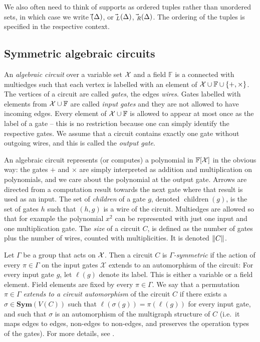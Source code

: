 \documentclass[10pt,a4paper]{article}
\theoremstyle{definition}
\theoremstyle{plain}
\theoremstyle{remark}
\DeclarePairedDelimiter{\norm}{\lVert}{\rVert}
\newcommand{\Xx}{{\cal X}}
\newcommand{\Sym}{\mathbf{Sym}}
\DeclareMathOperator{\child}{children}
\newcommand{\bbF}{\mathbb{F}}
\let\sup\relax
\DeclareMathOperator{\sup}{sup}
\begin{document}
We also often need to think of supports as ordered tuples rather than unordered sets, in which case we write $\vec{\sup}(\Delta)$, or $\vec{\sup}_L(\Delta)$, $\vec{\sup}_R(\Delta)$. The ordering of the tuples is specified in the respective context.





\subsection{Symmetric algebraic circuits}

An \emph{algebraic circuit} over a variable set $\Xx$ and a field $\bbF$ is a connected  with multiedges
such that each vertex is labelled with an element of $\Xx \cup \bbF \cup \{+,\times\}$. 	The vertices of a circuit are called \emph{gates}, the edges \emph{wires}.
Gates labelled with elements from $\Xx \cup \bbF$ are called
\emph{input gates} and they are not allowed to have incoming
edges. Every element of $\Xx \cup \bbF$ is allowed to appear at most once as the label of a gate -- this is no restriction because one can simply identify the respective gates.  We assume that a circuit contains exactly one gate without outgoing wires, and this is called the \emph{output gate}.

An algebraic circuit represents (or computes) a polynomial in
$\bbF[\Xx]$ in the obvious way: the gates $+$ and $\times$
are simply interpreted as addition and multiplication on
polynomials, and we care about the polynomial at the output
gate. Arrows are directed from a computation result towards
the next gate where that result is used as an input. The set
of \emph{children} of a gate $g$, denoted $\child(g)$, is the
set of gates $h$ such that $(h,g)$ is a wire of the circuit.  
Multiedges are allowed so that for example the polynomial
$x^2$ can be represented with just one input and one
multiplication gate. The \emph{size} of a circuit $C$, is
defined as the number of gates plus the number of wires, counted with multiplicities. It is denoted $\norm{C}$.

Let $\Gamma$ be a group that acts on $\Xx$. Then a circuit $C$ is \emph{$\Gamma$-symmetric} if the action of every $\pi \in \Gamma$ on the input gates $\mathcal{X}$ extends to an automorphism of the circuit:
For every input gate $g$, let $\ell(g)$ denote its label. This is either a variable or a field element. 
Field elements are fixed by every $\pi \in \Gamma$.
We say that a permutation $\pi \in \Gamma$ \emph{extends to a circuit automorphism} of the  circuit $C$ 
if there exists a $\sigma \in \Sym(V(C))$ such that $\ell(\sigma(g)) = \pi(\ell(g))$ for every input gate, 
and such that $\sigma$ is an automorphism of the multigraph structure of $C$ (i.e.\ it maps edges to edges, non-edges to non-edges, and preserves the operation types of the gates). 
For more details, see \cite{dawar_symmetric_2025}. 
\end{document}
